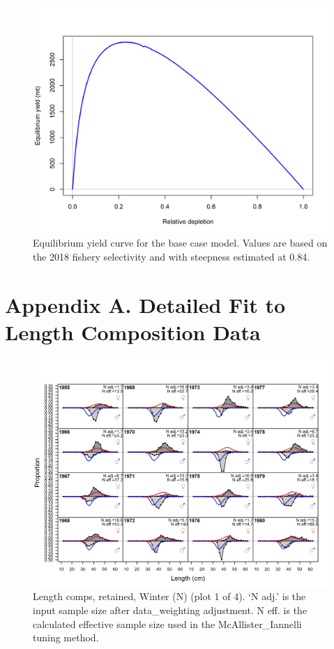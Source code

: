 \documentclass[12pt,]{article}
\begin{document}
\FloatBarrier

\begin{figure}
\centering
\includegraphics{r4ss/plots_mod1/yield1_yield_curve.png}
\caption{Equilibrium yield curve for the base case model. Values are
based on the 2018 fishery selectivity and with steepness estimated at
0.84. \label{fig:yield}}
\end{figure}

\FloatBarrier

\newpage

\FloatBarrier
\newpage

\section{Appendix A. Detailed Fit to Length Composition
Data}\label{appendix-a.-detailed-fit-to-length-composition-data}

\begin{figure}
\centering
\includegraphics{r4ss/plots_mod1/comp_lenfit_flt1mkt2_page1.png}
\caption{Length comps, retained, Winter (N) (plot 1 of 4). `N adj.' is
the input sample size after data\_weighting adjustment. N eff. is the
calculated effective sample size used in the McAllister\_Iannelli tuning
method. \label{fig:length_fits}}
\end{figure}
\end{document}

